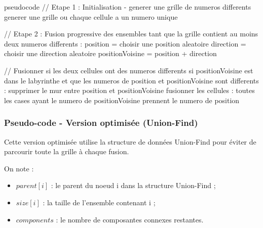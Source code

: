 \documentclass{butexFR}
\begin{document}
\begin{codeboxlang}{pseudocode}
// Etape 1 : Initialisation - generer une grille de numeros differents
generer une grille ou chaque cellule a un numero unique

// Etape 2 : Fusion progressive des ensembles
tant que la grille contient au moins deux numeros differents :
    position = choisir une position aleatoire
    direction = choisir une direction aleatoire
    positionVoisine = position + direction

    // Fusionner si les deux cellules ont des numeros differents
    si positionVoisine est dans le labyrinthe et que les numeros de position et positionVoisine sont differents :
        supprimer le mur entre position et positionVoisine
        fusionner les cellules : toutes les cases ayant le numero de positionVoisine
            prennent le numero de position

\end{codeboxlang}

\subsubsection{Pseudo-code - Version optimisée (Union-Find)}

Cette version optimisée utilise la structure de données Union-Find pour éviter de parcourir toute la grille à chaque fusion.

On note :
\begin{itemize}
\item \( parent[i] \) : le parent du noeud i dans la structure Union-Find ;
\item \( size[i] \) : la taille de l'ensemble contenant i ;
\item \( components \) : le nombre de composantes connexes restantes.
\end{itemize}
\end{document}
